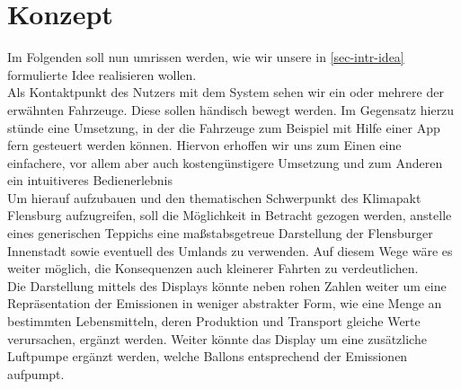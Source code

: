 \documentclass[.../Dokumentation.tex]{subfiles}
\begin{document}
\section{Konzept}\label{sec-concept}
Im Folgenden soll nun umrissen werden, wie wir unsere in \ref{sec-intr-idea} 
formulierte Idee realisieren wollen.\\
Als Kontaktpunkt des Nutzers mit dem System sehen wir ein oder mehrere der 
erwähnten Fahrzeuge. Diese sollen händisch bewegt werden. Im Gegensatz hierzu 
stünde eine Umsetzung, in der die Fahrzeuge zum Beispiel mit Hilfe einer 
App fern gesteuert werden können.
Hiervon erhoffen wir uns zum Einen eine einfachere, vor allem aber auch 
kostengünstigere Umsetzung und zum Anderen ein intuitiveres Bedienerlebnis\\
Um hierauf aufzubauen und den thematischen Schwerpunkt des Klimapakt Flensburg 
aufzugreifen, soll die Möglichkeit in Betracht gezogen werden, anstelle 
eines generischen Teppichs eine maßstabsgetreue Darstellung der Flensburger 
Innenstadt sowie eventuell des Umlands zu verwenden.
Auf diesem Wege wäre es weiter möglich, die Konsequenzen auch kleinerer Fahrten 
zu verdeutlichen.\\
Die Darstellung mittels des Displays könnte neben rohen Zahlen weiter um eine 
Repräsentation der Emissionen in weniger abstrakter Form, wie eine Menge 
an bestimmten Lebensmitteln, deren Produktion und Transport gleiche Werte 
verursachen, ergänzt werden.
Weiter könnte das Display um eine zusätzliche Luftpumpe ergänzt werden, 
welche Ballons entsprechend der Emissionen aufpumpt.
\end{document}
